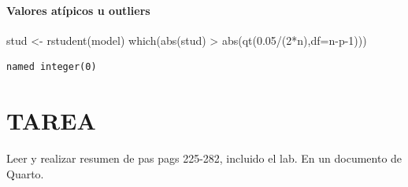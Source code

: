 \documentclass[
  letterpaper,
  DIV=11,
  numbers=noendperiod]{scrartcl}
\let\oldparagraph\paragraph
\renewcommand{\paragraph}[1]{\oldparagraph{#1}\mbox{}}
\newenvironment{Shaded}{\begin{snugshade}}{\end{snugshade}}
\newcommand{\AttributeTok}[1]{\textcolor[rgb]{0.40,0.45,0.13}{#1}}
\newcommand{\DecValTok}[1]{\textcolor[rgb]{0.68,0.00,0.00}{#1}}
\newcommand{\FloatTok}[1]{\textcolor[rgb]{0.68,0.00,0.00}{#1}}
\newcommand{\FunctionTok}[1]{\textcolor[rgb]{0.28,0.35,0.67}{#1}}
\newcommand{\NormalTok}[1]{\textcolor[rgb]{0.00,0.23,0.31}{#1}}
\newcommand{\OtherTok}[1]{\textcolor[rgb]{0.00,0.23,0.31}{#1}}
\newcommand{\SpecialCharTok}[1]{\textcolor[rgb]{0.37,0.37,0.37}{#1}}
\begin{document}
\hypertarget{valores-atuxedpicos-u-outliers}{%
\paragraph{Valores atípicos u
outliers}\label{valores-atuxedpicos-u-outliers}}

\begin{Shaded}
\begin{Highlighting}[]
\NormalTok{stud }\OtherTok{\textless{}{-}} \FunctionTok{rstudent}\NormalTok{(model)}
\FunctionTok{which}\NormalTok{(}\FunctionTok{abs}\NormalTok{(stud) }\SpecialCharTok{\textgreater{}} \FunctionTok{abs}\NormalTok{(}\FunctionTok{qt}\NormalTok{(}\FloatTok{0.05}\SpecialCharTok{/}\NormalTok{(}\DecValTok{2}\SpecialCharTok{*}\NormalTok{n),}\AttributeTok{df=}\NormalTok{n}\SpecialCharTok{{-}}\NormalTok{p}\DecValTok{{-}1}\NormalTok{)))}
\end{Highlighting}
\end{Shaded}

\begin{verbatim}
named integer(0)
\end{verbatim}

\hypertarget{tarea}{%
\section{TAREA}\label{tarea}}

Leer y realizar resumen de pas pags 225-282, incluido el lab. En un
documento de Quarto.
\end{document}
